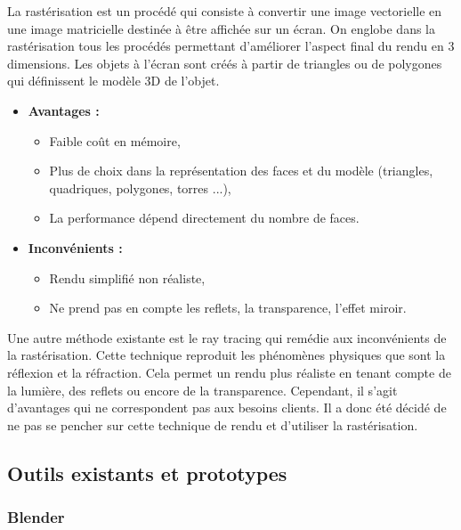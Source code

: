 \documentclass[a4paper]{article}
\begin{document}
            La rastérisation est un procédé qui consiste à convertir une image vectorielle en une image matricielle destinée à être affichée sur un écran. On englobe dans la rastérisation tous les procédés permettant d'améliorer l'aspect final du rendu en 3 dimensions.
            Les objets à l'écran sont créés à partir de triangles ou de polygones qui définissent le modèle 3D de l'objet.
            \begin{itemize}
                \item \textbf{Avantages :}
                \begin{itemize}
                    \item Faible coût en mémoire,
                    \item Plus de choix dans la représentation des faces et du modèle (triangles, quadriques, polygones, torres ...),
                    \item La performance dépend directement du nombre de faces.
                \end{itemize}
                \item  \textbf{Inconvénients :}
                \begin{itemize}
                    \item Rendu simplifié non réaliste,
                    \item Ne prend pas en compte les reflets, la transparence, l'effet miroir.
                \end{itemize}
            \end{itemize}
        
Une autre méthode existante est le ray tracing qui remédie aux inconvénients de la rastérisation. Cette technique reproduit les phénomènes physiques que sont la réflexion et la réfraction. Cela permet un rendu plus réaliste en tenant compte de la lumière, des reflets ou encore de la transparence. Cependant, il s'agit d'avantages qui ne correspondent pas aux besoins clients. Il a donc été décidé de ne pas se pencher sur cette technique de rendu et d'utiliser la rastérisation.
        
\subsection{Outils existants et prototypes}

\subsubsection{Blender \cite{Blender}}
\end{document}
